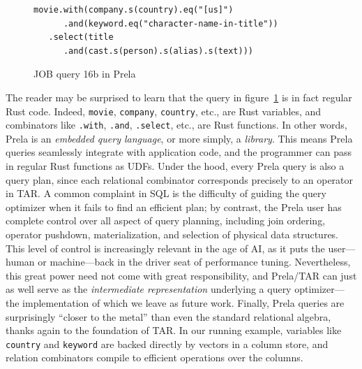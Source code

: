 \documentclass[sigconf,screen,pbalance]{cidr-2027}
\newcommand{\noun}[1]{\textsf{#1}}
\newcommand{\code}{\lstinline[style=prela]}
\begin{document}
\begin{figure}[t]
\begin{lstlisting}
movie.with(company.s(country).eq("[us]")
      .and(keyword.eq("character-name-in-title"))
   .select(title
      .and(cast.s(person).s(alias).s(text)))
\end{lstlisting}
\caption{JOB query 16b in Prela}
\label{fig-job16b}
\end{figure}

The reader may be surprised to learn that the query in figure~\ref{fig-job16b} is in fact regular Rust code.
Indeed, \code|movie|, \code|company|, \code|country|, etc., are Rust variables, and combinators like \code|.with|, \code|.and|, \code|.select|, etc., are Rust functions.
In other words, Prela is an \emph{embedded query language}, or more simply, a \emph{library}.
This means Prela queries seamlessly integrate with application code, and the programmer can pass in regular Rust functions as UDFs.
Under the hood, every Prela query is also a query plan, since each relational combinator corresponds precisely to an operator in \noun{TAR}.
A common complaint in SQL is the difficulty of guiding the query optimizer when it fails to find an efficient plan; by contrast, the Prela user has complete control over all aspect of query planning, including join ordering, operator pushdown, materialization, and selection of physical data structures.
This level of control is increasingly relevant in the age of AI, as it puts the user---human or machine---back in the driver seat of performance tuning.
Nevertheless, this great power need not come with great responsibility, and Prela/\noun{TAR} can just as well serve as the \emph{intermediate representation} underlying a query optimizer---the implementation of which we leave as future work.
Finally, Prela queries are surprisingly ``closer to the metal'' than even the standard relational algebra, thanks again to the foundation of \noun{TAR}.
In our running example, variables like \code|country| and \code|keyword| are backed directly by vectors in a column store, and relation combinators compile to efficient operations over the columns.
\end{document}
